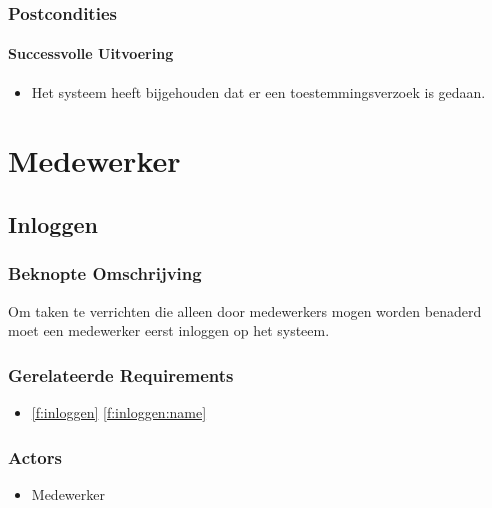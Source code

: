\documentclass[a4paper,titlepage]{report}
\makeatletter
\def\namedlabel#1#2{
  \label{#1}
  \begingroup
   \def\@currentlabel{#2}%
   \label{#1:name}\endgroup
}
\def\namedref#1{\ref{#1} \ref{#1:name}}
\makeatother
\begin{document}
      \subsubsection{Postcondities}
        \paragraph{Successvolle Uitvoering}
        \begin{itemize}
          \item Het systeem heeft bijgehouden dat er een toestemmingsverzoek
            is gedaan.
        \end{itemize}

  \pagebreak
  \section{Medewerker}
    \subsection{Inloggen}
    \namedlabel{u:inloggen}{Inloggen}
      \subsubsection{Beknopte Omschrijving}
        Om taken te verrichten die alleen door medewerkers mogen worden
        benaderd moet een medewerker eerst inloggen op het systeem.
      \subsubsection{Gerelateerde Requirements}
        \begin{itemize}
          \item \namedref{f:inloggen}
        \end{itemize}
      \subsubsection{Actors}
        \begin{itemize}
          \item Medewerker
        \end{itemize}
\end{document}
